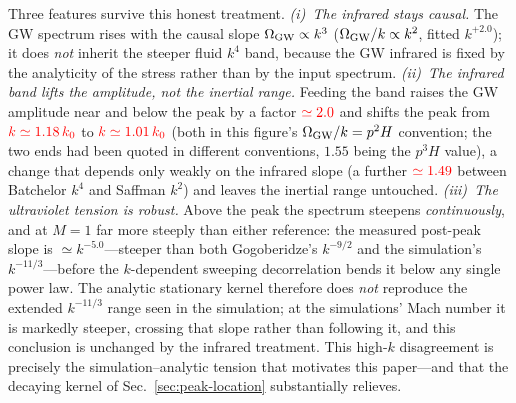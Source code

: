 \documentclass[10pt,prd,aps,nobibnotes,superscriptaddress,preprintnumbers,notitlepage]{revtex4-1}
\newcommand{\add}[1]{{\color{red}#1}}
\newcommand{\add}[1]{#1}
\begin{document}
Three features survive this honest treatment. \emph{(i)~The infrared stays causal.}
The GW spectrum rises with the causal slope $\Omega_{\rm GW}\propto k^3$
($\Omega_{\rm GW}/k\propto k^2$, fitted $k^{+2.0}$); it does \emph{not} inherit the
steeper fluid $k^4$ band, because the GW infrared is fixed by the analyticity of the
stress rather than by the input spectrum. \emph{(ii)~The infrared band lifts the
amplitude, not the inertial range.} Feeding the band raises the GW amplitude near and
below the peak by a factor $\add{\simeq2.0}$ and shifts the peak from
$\add{k\simeq1.18\,k_0}$ to $\add{k\simeq1.01\,k_0}$
\add{(both in this figure's $\Omega_{\rm GW}/k=p^{2}H$ convention; the two ends had been
quoted in different conventions, $1.55$ being the $p^{3}H$ value)},
a change that depends only weakly on the infrared slope (a further
$\add{\simeq1.49}$ between Batchelor $k^4$ and Saffman $k^2$) and leaves the inertial range
untouched. \emph{(iii)~The ultraviolet tension is robust.} Above the peak the
spectrum steepens \emph{continuously}, and at $M=1$ far more steeply than either
reference: the measured post-peak slope is $\simeq k^{-5.0}$---steeper than both
Gogoberidze's $k^{-9/2}$ and the simulation's $k^{-11/3}$---before the $k$-dependent
sweeping decorrelation bends it below any single power law. The analytic stationary
kernel therefore does \emph{not} reproduce the extended $k^{-11/3}$ range seen in the
simulation; at the simulations' Mach number it is markedly steeper, crossing that
slope rather than following it, and this conclusion is unchanged by the infrared
treatment. This high-$k$ disagreement is precisely the simulation--analytic tension
that motivates this paper---and that the decaying kernel of
Sec.~\ref{sec:peak-location} substantially relieves.
\end{document}
